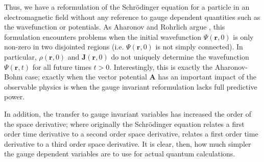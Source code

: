 Thus, we have a reformulation of the Schr\"odinger equation for a particle in an
electromagnetic field without any reference to gauge dependent quantities such
as the wavefunction or potentials. As Aharonov and Rohrlich argue
\cite{aharonov-rohrlich}, this formulation encounters problems when the initial
wavefunction $\Psi(\mathbf{r}, 0)$ is only non-zero in two disjointed regions
(i.e. $\Psi(\mathbf{r}, 0)$ is not simply connected). In particular,
$\rho(\mathbf{r}, 0)$ and $\mathbf{J}(\mathbf{r}, 0)$ do not uniquely determine
the wavefunction $\Psi(\mathbf{r}, t)$ for all future times $t > 0$.
Interestingly, this is exactly the Aharonov-Bohm case; exactly when the vector
potential $\mathbf{A}$ has an important impact of the observable physics is when
the gauge invariant reformulation lacks full predictive power.

In addition, the transfer to gauge invariant variables has increased the order
of the space derivative; where originally the Schr\"odinger equation relates a
first order time derivative to a second order space derivative,
 relates a first order time derivative to a third order space
derivative. It is clear, then, how much simpler the gauge dependent variables
are to use for actual quantum calculations.
